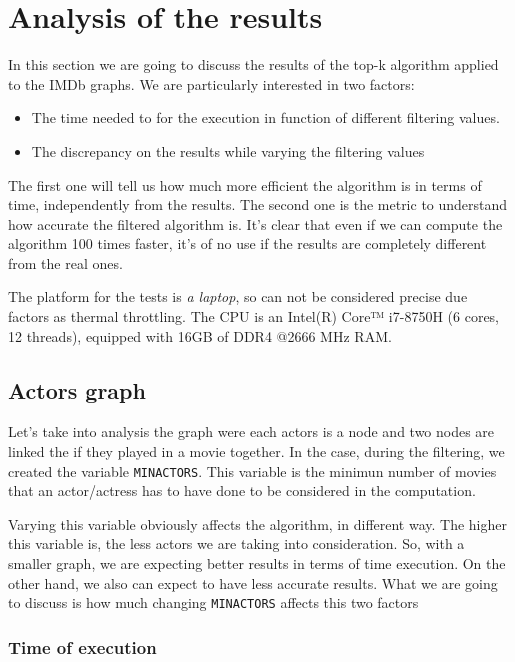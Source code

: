 \section{Analysis of the results}
In this section we are going to discuss the results of the top-k algorithm applied to the IMDb graphs. We are particularly interested in two factors:
\begin{itemize}
    \item The time needed to for the execution in function of different filtering values.
    \item The discrepancy on the results while varying the filtering values
\end{itemize}
The first one will tell us how much more efficient the algorithm is in terms of time, independently from the results. The second one is the metric to understand how accurate the filtered algorithm is. It's clear that even if we can compute the algorithm 100 times faster, it's of no use if the results are completely different from the real ones.\s

\nd The platform for the tests is \emph{a laptop}, so can not be considered precise due factors as thermal throttling. The CPU is an Intel(R) Core™ i7-8750H (6 cores, 12 threads), equipped with 16GB of DDR4 @2666 MHz RAM.

\subsection{Actors graph} \label{actors-graph}
Let's take into analysis the graph were each actors is a node and two nodes are linked the if they played in a movie together. In the case, during the filtering, we created the variable \texttt{MIN\textunderscore ACTORS}. This variable is the minimun number of movies that an actor/actress has to have done to be considered in the computation.

Varying this variable obviously affects the algorithm, in different way. The higher this variable is, the less actors we are taking into consideration. So, with a smaller graph, we are expecting better results in terms of time execution. On the other hand, we also can expect to have less accurate results. What we are going to discuss is how much changing \texttt{MIN\textunderscore ACTORS} affects this two factors

\subsubsection{Time of execution}

